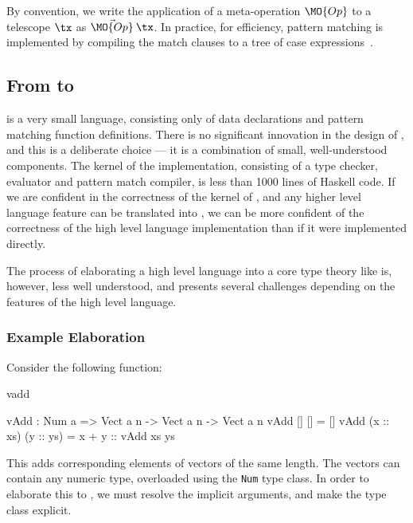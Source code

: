 By convention, we write the application of a meta-operation $\MO{Op}$ 
to a telescope $\tx$ as $\vec{\MO{Op}}\:\tx$.
In practice, for efficiency, pattern matching is implemented by compiling the match clauses to
a tree of case expressions~\cite{Augustsson1985}. 

\subsection{From \Idris{} to \TT{}}

\TT{} is a very small language, consisting only of data declarations and pattern matching
function definitions. There is no significant innovation in the design of \TT{}, and this
is a deliberate choice --- it is a combination of small, well-understood components.
The kernel of the \TT{} implementation, consisting of a type checker, evaluator and
pattern match compiler, is less than 1000 lines of Haskell code. If we are confident
in the correctness of the kernel of \TT{}, and any higher level language feature
can be translated into \TT{}, we can be more confident of the correctness of the high
level language implementation than if it were implemented directly.

The process of elaborating a high level language into a core type theory like \TT{} is,
however, less well understood, and presents several challenges depending on the
features of the high level language. 

\subsubsection{Example Elaboration}

Consider the following \Idris{} function:

\begin{SaveVerbatim}{vadd}

vAdd : Num a => Vect a n -> Vect a n -> Vect a n
vAdd []        []        = []
vAdd (x :: xs) (y :: ys) = x + y :: vAdd xs ys

\end{SaveVerbatim}

\noindent
This adds corresponding elements of vectors of the same length. The vectors can contain
any numeric type, overloaded using the \texttt{Num} type class. In order to elaborate
this to \TT{}, we must resolve the implicit arguments, and make the type class explicit.


